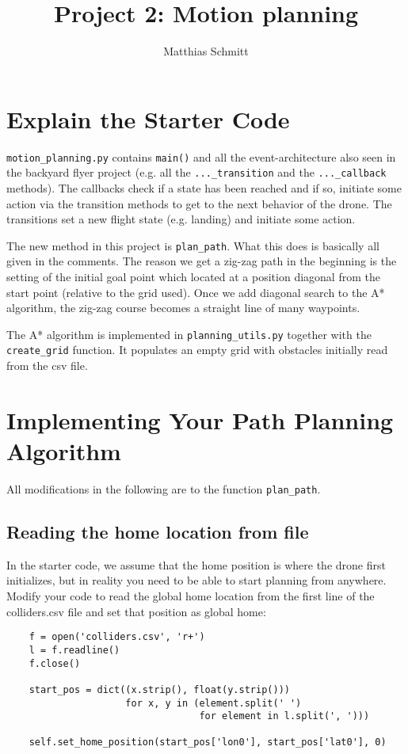 \documentclass[12pt]{article}
\begin{document}
\title{Project 2: Motion planning}%
\author{Matthias Schmitt}%


\maketitle

\section{Explain the Starter Code}

\verb+motion_planning.py+ contains \verb+main()+ and all the event-architecture also seen in the backyard flyer project (e.g. all the \verb+..._transition+ and the \verb+..._callback+ methods). The callbacks check if a state has been reached and if so, initiate some action via the transition methods to get to the next behavior of the drone. The transitions set a new flight state (e.g. landing) and initiate some action.
 
The new method in this project is \verb+plan_path+. What this does is basically all given in the comments. The reason we get a zig-zag path in 
the beginning is the setting of the initial goal point which located at a position diagonal from the start point (relative to the grid used).
Once we add diagonal search to the A* algorithm, the zig-zag course becomes a straight line of many waypoints.

The A* algorithm is implemented in \verb+planning_utils.py+ together with the \verb+create_grid+ function. It populates an empty grid with obstacles initially read from the csv file.

\section{Implementing Your Path Planning Algorithm}

All modifications in the following are to the function \verb+plan_path+.

\subsection{Reading the home location from file}
In the starter code, we assume that the home position is where the drone first initializes, but in reality you need to be able to start planning from anywhere. Modify your code to read the global home location from the first line of the colliders.csv file and set that position as global home:

\begin{verbatim}
    f = open('colliders.csv', 'r+')
    l = f.readline()
    f.close()

    start_pos = dict((x.strip(), float(y.strip()))
                     for x, y in (element.split(' ')
                                  for element in l.split(', ')))

    self.set_home_position(start_pos['lon0'], start_pos['lat0'], 0)
\end{verbatim}
\end{document}

